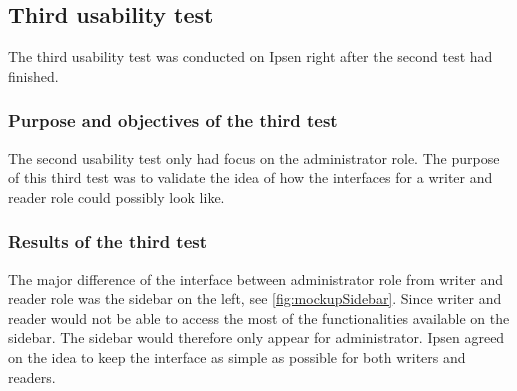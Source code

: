 \documentclass[../../master.tex]{subfiles}
\begin{document}
\subsection{Third usability test}\label{thirdtest}
The third usability test was conducted on Ipsen right after the second test had finished.

\subsubsection*{Purpose and objectives of the third test}
The second usability test only had focus on the administrator role.
The purpose of this third test was to validate the idea of how the interfaces for a writer and reader role could possibly look like.

\subsubsection*{Results of the third test}
The major difference of the interface between administrator role from writer and reader role was the sidebar on the left, see \cref{fig:mockupSidebar}.
Since writer and reader would not be able to access the most of the functionalities available on the sidebar.
The sidebar would therefore only appear for administrator.
Ipsen agreed on the idea to keep the interface as simple as possible for both writers and readers.
\end{document}
